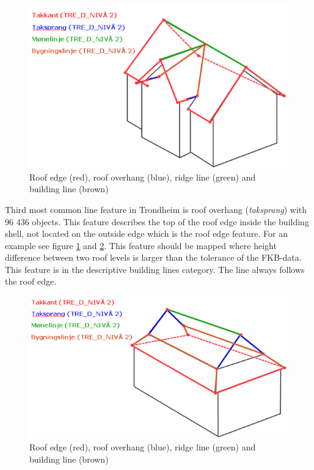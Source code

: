 \begin{figure}[H]
    \centering
    \includegraphics[scale=0.5]{figures/kurve_4tak_fkb.png}
    \caption{Roof edge (red), roof overhang (blue), ridge line (green) and building line (brown) \cite{Kartverket2013a}}
    \label{fig:kurve_tak_fkb}
\end{figure} 

Third most common line feature in Trondheim is roof overhang (\textit{taksprang}) with 96 436 objects. This feature describes the top of the roof edge inside the building shell, not located on the outside edge which is the roof edge feature. For an example see figure \ref{fig:kurve_tak_fkb} and \ref{fig:kurve_4tak_fkb}. This feature should be mapped where height difference between two roof levels is larger than the tolerance of the FKB-data. This feature is in the descriptive building lines category. The line always follows the roof edge. 

\begin{figure}[H]
    \centering
    \includegraphics[scale=0.5]{figures/kurve_4tak_fkb2.png}
    \caption{Roof edge (red), roof overhang (blue), ridge line (green) and building line (brown) \cite{Kartverket2013a}}
    \label{fig:kurve_4tak_fkb}
\end{figure} 

